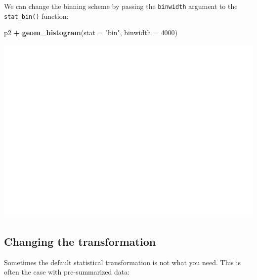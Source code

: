 \documentclass[]{book}
\newenvironment{Shaded}{\begin{snugshade}}{\end{snugshade}}
\newcommand{\DataTypeTok}[1]{\textcolor[rgb]{0.13,0.29,0.53}{#1}}
\newcommand{\DecValTok}[1]{\textcolor[rgb]{0.00,0.00,0.81}{#1}}
\newcommand{\KeywordTok}[1]{\textcolor[rgb]{0.13,0.29,0.53}{\textbf{#1}}}
\newcommand{\NormalTok}[1]{#1}
\newcommand{\OperatorTok}[1]{\textcolor[rgb]{0.81,0.36,0.00}{\textbf{#1}}}
\newcommand{\StringTok}[1]{\textcolor[rgb]{0.31,0.60,0.02}{#1}}
\begin{document}
We can change the binning scheme by passing the \texttt{binwidth} argument to the \texttt{stat\_bin()} function:

\begin{Shaded}
\begin{Highlighting}[]
\NormalTok{p2 }\OperatorTok{+}\StringTok{ }\KeywordTok{geom_histogram}\NormalTok{(}\DataTypeTok{stat =} \StringTok{"bin"}\NormalTok{, }\DataTypeTok{binwidth =} \DecValTok{4000}\NormalTok{)}
\end{Highlighting}
\end{Shaded}

\includegraphics{R/Rgraphics/figures/unnamed-chunk-166-1.pdf}

\hypertarget{changing-the-transformation}{%
\subsection{Changing the transformation}\label{changing-the-transformation}}

Sometimes the default statistical transformation is not what you need. This is often the case with pre-summarized data:

\begin{Shaded}
\end{Shaded}
\end{document}
